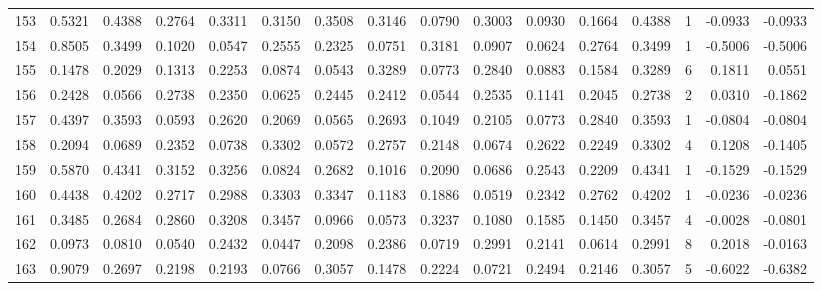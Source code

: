 \begin{tabular}{lrrrrrrrrrrrrrrr}
153 &      0.5321 &  0.4388 &  0.2764 &  0.3311 &  0.3150 &  0.3508 &  0.3146 &  0.0790 &  0.3003 &  0.0930 &   0.1664 &     0.4388 &      1 &                   -0.0933 &                    -0.0933 \\
154 &      0.8505 &  0.3499 &  0.1020 &  0.0547 &  0.2555 &  0.2325 &  0.0751 &  0.3181 &  0.0907 &  0.0624 &   0.2764 &     0.3499 &      1 &                   -0.5006 &                    -0.5006 \\
155 &      0.1478 &  0.2029 &  0.1313 &  0.2253 &  0.0874 &  0.0543 &  0.3289 &  0.0773 &  0.2840 &  0.0883 &   0.1584 &     0.3289 &      6 &                    0.1811 &                     0.0551 \\
156 &      0.2428 &  0.0566 &  0.2738 &  0.2350 &  0.0625 &  0.2445 &  0.2412 &  0.0544 &  0.2535 &  0.1141 &   0.2045 &     0.2738 &      2 &                    0.0310 &                    -0.1862 \\
157 &      0.4397 &  0.3593 &  0.0593 &  0.2620 &  0.2069 &  0.0565 &  0.2693 &  0.1049 &  0.2105 &  0.0773 &   0.2840 &     0.3593 &      1 &                   -0.0804 &                    -0.0804 \\
158 &      0.2094 &  0.0689 &  0.2352 &  0.0738 &  0.3302 &  0.0572 &  0.2757 &  0.2148 &  0.0674 &  0.2622 &   0.2249 &     0.3302 &      4 &                    0.1208 &                    -0.1405 \\
159 &      0.5870 &  0.4341 &  0.3152 &  0.3256 &  0.0824 &  0.2682 &  0.1016 &  0.2090 &  0.0686 &  0.2543 &   0.2209 &     0.4341 &      1 &                   -0.1529 &                    -0.1529 \\
160 &      0.4438 &  0.4202 &  0.2717 &  0.2988 &  0.3303 &  0.3347 &  0.1183 &  0.1886 &  0.0519 &  0.2342 &   0.2762 &     0.4202 &      1 &                   -0.0236 &                    -0.0236 \\
161 &      0.3485 &  0.2684 &  0.2860 &  0.3208 &  0.3457 &  0.0966 &  0.0573 &  0.3237 &  0.1080 &  0.1585 &   0.1450 &     0.3457 &      4 &                   -0.0028 &                    -0.0801 \\
162 &      0.0973 &  0.0810 &  0.0540 &  0.2432 &  0.0447 &  0.2098 &  0.2386 &  0.0719 &  0.2991 &  0.2141 &   0.0614 &     0.2991 &      8 &                    0.2018 &                    -0.0163 \\
163 &      0.9079 &  0.2697 &  0.2198 &  0.2193 &  0.0766 &  0.3057 &  0.1478 &  0.2224 &  0.0721 &  0.2494 &   0.2146 &     0.3057 &      5 &                   -0.6022 &                    -0.6382 \\

\end{tabular}
